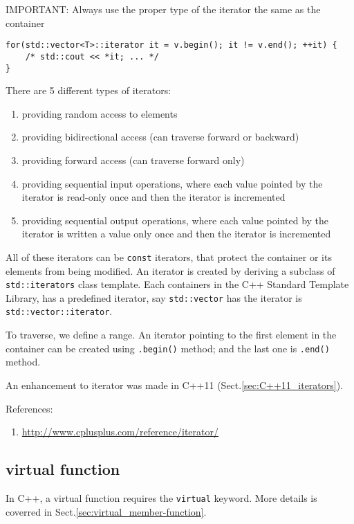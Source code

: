IMPORTANT: Always use the proper type of the iterator the same as the container
{\small \begin{verbatim}
for(std::vector<T>::iterator it = v.begin(); it != v.end(); ++it) {
    /* std::cout << *it; ... */
}
\end{verbatim}}


There are 5 different types of iterators:
\begin{enumerate}
  \item providing random access to elements
  \item providing bidirectional access (can traverse forward or backward)
  \item providing forward access (can traverse forward only)
  \item providing sequential input operations, where each value pointed by the
  iterator is read-only once and then the iterator is incremented
  \item providing sequential output operations, where each value pointed by the
  iterator is written a value only once and then the iterator is incremented
\end{enumerate} 
All of these iterators can be \verb!const! iterators, that protect the
container or its elements from being modified. An iterator is created by
deriving a subclass of \verb!std::iterators! class template. Each containers in
the C++ Standard Template Library, has a predefined iterator, say
\verb!std::vector! has the iterator is \verb!std::vector::iterator!.

To traverse, we define a range. An iterator pointing to the first element in the
container can be created using \verb!.begin()! method; and the last one is
\verb!.end()! method.

An enhancement to iterator was made in C++11 (Sect.\ref{sec:C++11_iterators}).

References:
\begin{enumerate}
  \item \url{http://www.cplusplus.com/reference/iterator/}
\end{enumerate}

\subsection{virtual function}
\label{sec:C++98_virtual-functions}

In C++, a virtual function requires the \verb!virtual! keyword.
More details is coverred in Sect.\ref{sec:virtual_member-function}.

